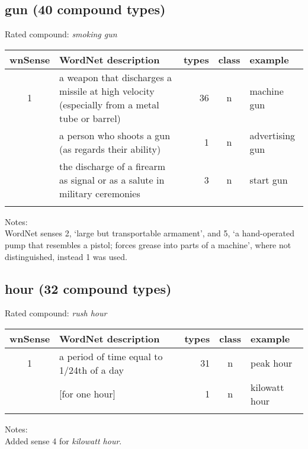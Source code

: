\subsection{gun       (40 compound types)}
Rated compound: \emph{smoking gun}

\vspace*{1ex}

\noindent
\begin{longtable}{c>{\raggedright\arraybackslash}p{5cm}rc>{\raggedright\arraybackslash}p{2cm}}\lsptoprule
{\small wnSense}&WordNet description&types&class&example\\\midrule
1&a weapon that discharges a missile at high velocity (especially from a metal tube or barrel)&36&n&machine gun\\\tablevspace
3&a person who shoots a gun (as regards their ability)&1&n&advertising gun\\\tablevspace
7&the discharge of a firearm as signal or as a salute in military ceremonies&3&n&start gun\\\lspbottomrule
\end{longtable}

\noindent
Notes:\\
WordNet senses 2, `large but transportable armament', and 5, `a hand-operated pump that resembles a pistol; forces grease into parts of a machine', where not distinguished, instead 1 was used.

\subsection{hour      (32 compound types)}
Rated compound: \emph{rush hour}

\vspace*{1ex}

\noindent
\begin{longtable}{c>{\raggedright\arraybackslash}p{5cm}rc>{\raggedright\arraybackslash}p{2cm}}\lsptoprule
{\small wnSense}&WordNet description&types&class&example\\\midrule
1&a period of time equal to 1/24th of a day&31&n&peak hour\\\tablevspace
4&{}[for one hour]&1&n&kilowatt hour\\\lspbottomrule
\end{longtable}

\noindent
Notes:\\
Added sense 4 for \emph{kilowatt hour}.

